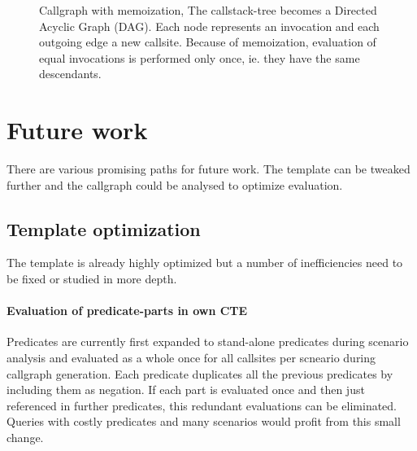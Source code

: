 

\begin{figure}
    \centering
    
    \caption{Callgraph with memoization, The callstack-tree becomes a Directed Acyclic Graph (DAG). Each node represents an invocation and each outgoing edge a new callsite. Because of memoization, evaluation of equal invocations is performed only once, ie. they have the same descendants.}
    \label{fig:fib_callstack_memoization}
\end{figure}



\section{Future work}

There are various promising paths for future work. The template can be tweaked further and the callgraph could be analysed to optimize evaluation.

\subsection{Template optimization}
The template is already highly optimized but a number of inefficiencies need to be fixed or studied in more depth.

\paragraph*{Evaluation of predicate-parts in own CTE}
Predicates are currently first expanded to stand-alone predicates during scenario analysis and evaluated as a whole once for all callsites per scneario during callgraph generation. Each predicate duplicates all the previous predicates by including them as negation. If each part is evaluated once and then just referenced in further predicates, this redundant evaluations can be eliminated. Queries with costly predicates and many scenarios would profit from this small change.

